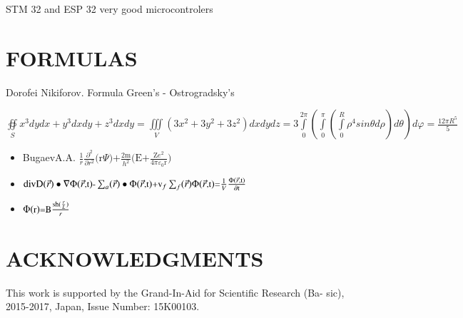 \documentclass{aip-cp}
\begin{document}
STM 32 and ESP 32 very good microcontrolers


\section{FORMULAS}


Dorofei Nikiforov. Formula Green's - Ostrogradsky's 

\begin{math}
\oiint \limits_S x^3 dydx + y^3 dxdy + z^3 dxdy = \iiint \limits_V (3x^2 + 3y^2 + 3z^2 )dxdydz = 
3\int \limits_0^{2\pi}(\int \limits_0^\pi (\int \limits_0^R \rho^4 sin  \theta  d \rho)d \theta)d  \varphi   = \frac {12 \pi R^5}{5}
\end{math}
\begin{itemize}
\item BugaevA.A.
        $\frac{1}{r}\frac{\partial^2}{\partial{r^2}}\textrm{(r}\Psi\textrm{)}\textrm{+}\frac{\textrm{2m}}{h^2}\textrm{(E+}\frac{\textrm{Z}e^2}{4\pi\varepsilon_0\textrm{r}}\textrm{)}$
  \item $\textrm{divD}\small(\vec{r}\small)\bullet\nabla\Phi\small(\vec{r}\textrm{,t}\small)\textrm{-}\sum_a\small(\vec{r}\small)\bullet\Phi\small(\vec{r}\textrm{,t}\small)\textrm{+}\textrm{v}_f\sum_f\small(\vec{r}\small)\Phi\small(\vec{r}\textrm{,t}\small)\textrm{=}\frac{1}{V}\frac{\Phi\small(\vec{r}\textrm{,t}\small)}{\partial\textrm{t}}$
  \item $\Phi\small(\textrm{r}\small)\textrm{=}\textrm{B}\frac{\textrm{sh}\small(\frac{r}{L}\small)}{r}$
\end{itemize}


\section{ACKNOWLEDGMENTS}
This work is supported by the Grand-In-Aid for Scientific Research (Ba- sic), 2015-2017, Japan, Issue Number: 15K00103.


\nocite{*}
%
%
\end{document}
